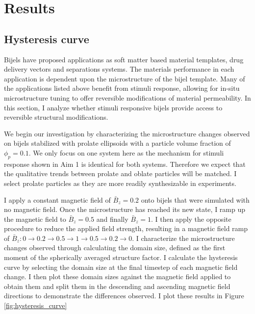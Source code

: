 \section{Results}\label{sec:results_p2}
\subsection{Hysteresis curve}\label{section:hysteresis_curve}

Bijels have proposed applications as soft matter based material templates, drug delivery vectors and separations systems. The materials 
performance in each application is dependent upon the microstructure of the bijel template. Many of the applications listed above benefit 
from stimuli response, allowing for in-situ microstructure tuning to offer reversible modifications of material permeability. In this section, I analyze
whether stimuli responsive bijels provide access to reversible structural modifications.

We begin our investigation by characterizing the microstructure changes observed on bijels stabilized with prolate ellipsoids with a 
particle volume fraction of $\phi_p = 0.1$. We only focus on one system here as the mechanism for stimuli response shown in Aim 1 is identical
for both systems. Therefore we expect that the qualitative trends between prolate and oblate particles will be matched. I select prolate particles
as they are more readily synthesizable in experiments. 

I apply a constant magnetic field of $\bar{B}_z = 0.2$ onto bijels that were simulated 
with no magnetic field. Once the microstructure has reached its new state, I ramp up the magnetic field to $\bar{B}_z = 0.5$ and 
finally $\bar{B}_z = 1$. I then apply the opposite procedure to reduce the applied field strength, resulting in a magnetic field 
ramp of $\bar{B}_z: 0 \rightarrow 0.2 \rightarrow 0.5 \rightarrow 1 \rightarrow 0.5 \rightarrow 0.2 \rightarrow 0$. I characterize the 
microstructure changes observed through calculating the domain size, defined as the first moment of the spherically averaged structure factor. 
I calculate the hysteresis 
curve by selecting the domain size at the final timestep of each magnetic field change. I then plot these domain sizes against the magnetic field 
applied to obtain them and split them in the descending and ascending magnetic field directions to demonstrate the differences observed. I plot 
these results in Figure \ref{fig:hysteresis_curve}

